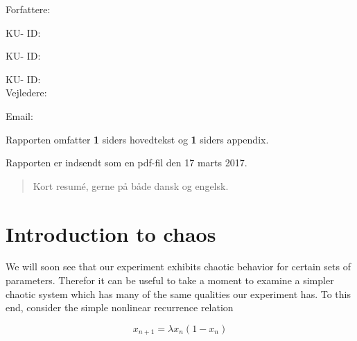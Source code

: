 \documentclass[12pt,oneside,a4paper]{article}
\numberwithin{equation}{section}
\begin{document}
\vfill
{\large Forfattere:}\\
{\large \hspace*{1cm}   \hspace{1cm} KU- ID:  \\
{\large \hspace*{1cm}    \hspace{1cm} KU- ID:  \\
{\large \hspace*{1cm}    \hspace{1cm} KU- ID:  \\

{\large Vejledere:}\\
{\large \hspace*{1cm}   \hspace{1cm} Email:  \\

\vfill

{\large Rapporten omfatter {\bf 1} siders hovedtekst og {\bf 1} siders appendix.}

{\large Rapporten er indsendt som en pdf-fil den 17 marts 2017. }

\normalsize


\newpage
\begin{abstract}
Kort resumé, gerne på både dansk og engelsk.
\end{abstract}

\newpage

\tableofcontents


\newpage
{}
\section{Introduction to chaos}
\label{chaos}
We will soon see that our experiment exhibits chaotic behavior for certain sets of parameters. Therefor it can be useful to take a moment to examine a simpler chaotic system which has many of the same qualities our experiment has. To this end, consider the simple nonlinear recurrence relation

\begin{equation}
x_{n+1}=\lambda x_n (1-x_n)
\end{equation}

}}}}
\end{document}
